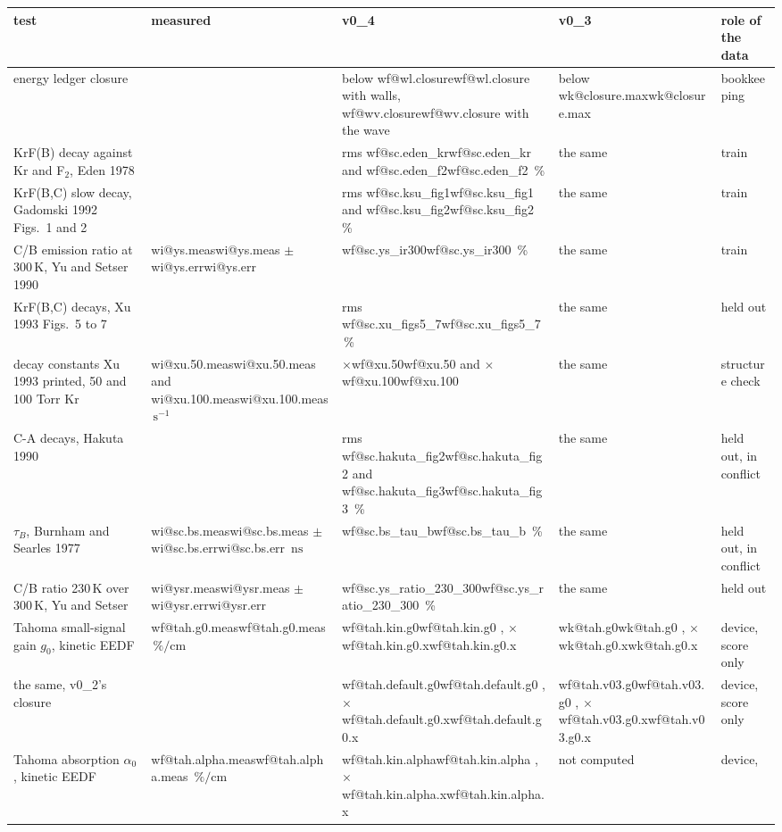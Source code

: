 \documentclass[11pt]{article}
\makeatletter
\newcommand\wi[1]{\ifcsname wi@#1\endcsname\csname wi@#1\endcsname
  \else\errmessage{no v0_2 number '#1'. Rerun make_overview_v0_2.py}\fi}
\newcommand\wk[1]{\ifcsname wk@#1\endcsname\csname wk@#1\endcsname
  \else\errmessage{no v0_3 number '#1'. Rerun make_overview_v0_3.py}\fi}
\newcommand\wf[1]{\ifcsname wf@#1\endcsname\csname wf@#1\endcsname
  \else\errmessage{no v0_4 number '#1'. Rerun make_overview_v0_4.py}\fi}
\newcommand{\unit}[1]{\ensuremath{\,\mathrm{#1}}}
\newcommand{\x}[1]{\ensuremath{\times}#1}
\makeatother
\begin{document}
\begin{table}[!tbp]
\centering\footnotesize
\renewcommand{\arraystretch}{1.12}
\begin{tabularx}{\linewidth}{@{}>{\raggedright\arraybackslash}X
  >{\raggedright\arraybackslash}p{2.3cm}>{\raggedright\arraybackslash}p{2.4cm}
  >{\raggedright\arraybackslash}p{2.3cm}>{\raggedright\arraybackslash}p{1.9cm}@{}}
\toprule
test & measured & v0\_4 & v0\_3 & role of the data\\
\midrule
energy ledger closure & & below \wf{wl.closure} with walls,
  \wf{wv.closure} with the wave & below \wk{closure.max} & bookkeeping\\
KrF(B) decay against Kr and F$_2$, Eden 1978 & & rms \wf{sc.eden_kr} and
  \wf{sc.eden_f2}\,\% & the same & train\\
KrF(B,C) slow decay, Gadomski 1992 Figs.\ 1 and 2 & & rms
  \wf{sc.ksu_fig1} and \wf{sc.ksu_fig2}\,\% & the same & train\\
C/B emission ratio at 300\unit{K}, Yu and Setser 1990 & \wi{ys.meas}
  $\pm$ \wi{ys.err} & \wf{sc.ys_ir300}\,\% & the same & train\\
KrF(B,C) decays, Xu 1993 Figs.\ 5 to 7 & & rms \wf{sc.xu_figs5_7}\,\% &
  the same & held out\\
decay constants Xu 1993 printed, 50 and 100 Torr Kr & \wi{xu.50.meas}
  and \wi{xu.100.meas}\unit{s^{-1}} & \x{\wf{xu.50}} and \x{\wf{xu.100}} &
  the same & structure check\\
C-A decays, Hakuta 1990 & & rms \wf{sc.hakuta_fig2} and
  \wf{sc.hakuta_fig3}\,\% & the same & held out, in conflict\\
$\tau_B$, Burnham and Searles 1977 & \wi{sc.bs.meas} $\pm$
  \wi{sc.bs.err}\unit{ns} & \wf{sc.bs_tau_b}\,\% & the same & held out, in
  conflict\\
C/B ratio 230\unit{K} over 300\unit{K}, Yu and Setser & \wi{ysr.meas}
  $\pm$ \wi{ysr.err} & \wf{sc.ys_ratio_230_300}\,\% & the same & held out\\
\midrule
Tahoma small-signal gain $g_0$, kinetic EEDF & \wf{tah.g0.meas}\unit{\%/cm} &
  \wf{tah.kin.g0}, \x{\wf{tah.kin.g0.x}} & \wk{tah.g0}, \x{\wk{tah.g0.x}} &
  device, score only\\
\quad the same, v0\_2's closure & & \wf{tah.default.g0},
  \x{\wf{tah.default.g0.x}} & \wf{tah.v03.g0}, \x{\wf{tah.v03.g0.x}} &
  device, score only\\
Tahoma absorption $\alpha_0$, kinetic EEDF & \wf{tah.alpha.meas}\unit{\%/cm}
  & \wf{tah.kin.alpha}, \x{\wf{tah.kin.alpha.x}} & not computed & device,

\end{tabularx}
\end{table}
\end{document}
